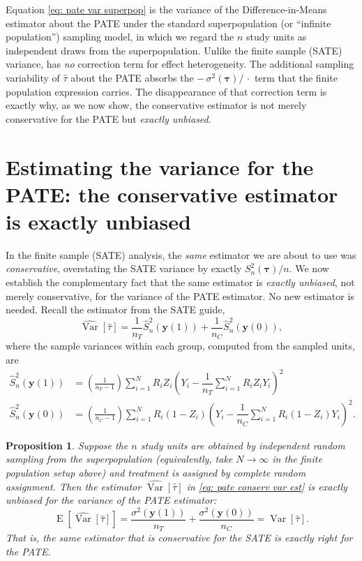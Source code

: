 \documentclass[12pt,leqno]{article}
\theoremstyle{newstyle}
\newtheorem{prop}[thm]{Proposition}
\DeclareMathOperator{\E}{\mathrm{E}}
\DeclareMathOperator{\Var}{\mathrm{Var}}
\newcommand{\pov}[1]{\bm{y}(#1)}    %
\newcommand{\tauhat}{\hat{\tau}}
\newcommand{\Ssq}[2][n]{S_{#1}^{2}(#2)}
\newcommand{\ssq}[2][n]{\sigma_{#1}^{2}(#2)}
\newcommand{\Ssqhat}[2][n]{\widehat{S}_{#1}^{2}(#2)}
\newcommand{\Varhat}{\widehat{\Var}}
\begin{document}
Equation \eqref{eq: pate var superpop} is the variance of the Difference-in-Means estimator about the PATE under the standard superpopulation (or \enquote{infinite population}) sampling model, in which we regard the $n$ study units as independent draws from the superpopulation. Unlike the finite sample (SATE) variance,  has \textit{no} correction term for effect heterogeneity. The additional sampling variability of $\tauhat$ about the PATE absorbs the $-\,\ssq[]{\bm{\tau}}/\,\cdot$ term that the finite population expression carries. The disappearance of that correction term is exactly why, as we now show, the conservative estimator is not merely conservative for the PATE but \textit{exactly unbiased}.

\section{Estimating the variance for the PATE: the conservative estimator is exactly unbiased}

In the finite sample (SATE) analysis, the \textit{same} estimator we are about to use was \textit{conservative}, overstating the SATE variance by exactly $\Ssq{\bm{\tau}}/n$. We now establish the complementary fact that the same estimator is \textit{exactly unbiased}, not merely conservative, for the variance of the PATE estimator. No new estimator is needed. Recall the estimator from the SATE guide,
\begin{equation}
\label{eq: pate conserv var est}
\Varhat\left[\tauhat\right] = \frac{1}{n_T} \Ssqhat{\pov{1}} + \frac{1}{n_C} \Ssqhat{\pov{0}},
\end{equation}
where the sample variances within each group, computed from the sampled units, are
\small
\begin{align*}
\Ssqhat{\pov{1}} & = \left(\frac{1}{n_T - 1}\right) \sum \limits_{i = 1}^N R_i Z_i \left(Y_i - \dfrac{1}{n_T} \sum \limits_{i = 1}^N R_i Z_i Y_i \right)^2 \\
\Ssqhat{\pov{0}} & = \left(\frac{1}{n_C - 1}\right) \sum \limits_{i = 1}^N R_i (1 - Z_i) \left(Y_i - \dfrac{1}{n_C} \sum \limits_{i = 1}^N R_i (1 - Z_i) Y_i\right)^2.
\end{align*}
\normalsize

\begin{prop} \label{prop: pate conservative}
Suppose the $n$ study units are obtained by independent random sampling from the superpopulation (equivalently, take $N \to \infty$ in the finite population setup above) and treatment is assigned by complete random assignment. Then the estimator $\Varhat[\tauhat]$ in \eqref{eq: pate conserv var est} is \textit{exactly unbiased} for the variance of the PATE estimator:
\begin{equation*}
\E\left[\Varhat\left[\tauhat\right]\right] = \dfrac{\ssq[]{\pov{1}}}{n_T} + \dfrac{\ssq[]{\pov{0}}}{n_C} = \Var\left[\tauhat\right].
\end{equation*}
That is, the same estimator that is conservative for the SATE is exactly right for the PATE.
\end{prop}
\end{document}

